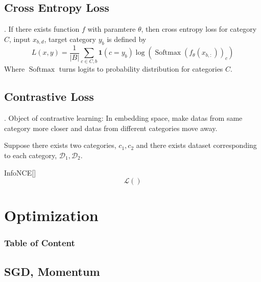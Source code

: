 \documentclass[8pt]{beamer}
\newcommand{\mb}[1]{\mathbf{#1}}
\newcommand{\mc}[1]{\mathcal{#1}}
\newcommand{\abs}[1]{\left\lvert #1 \right\rvert}
\newcommand{\Softmax}[1]{\operatorname{Softmax}\!\left(#1\right)}
\begin{document}
\subsection{Cross Entropy Loss}

\begin{frame}{.}
    If there exists function $f$ with paramtere $\theta$, then cross entropy loss for category $C$, input $x_{b,d}$, target category $y_{b}$ is defined by
    \[
        L(x,y) = \frac{1}{\abs{B}} \sum_{c \in C, b} \mb{1}(c = y_b) \log{( \Softmax{f_\theta(x_{b, :})}_{c})}
    \]
    Where $\operatorname{Softmax}$ turns logits to probability distribution for categories $C$.
\end{frame}

\subsection{Contrastive Loss}

\begin{frame}{.}
    Object of contrastive learning: In embedding space, make datas from same category more closer and datas from different categories move away.

    \bigskip
    Suppose there exists two categories, $c_1, c_2$ and there exists dataset corresponding to each category, $\mc{D}_1, \mc{D}_2$.

    \begin{block}{InfoNCE[\cite{oord2018representation}]}
        \[
            \mc{L}()
        \]
    \end{block}
\end{frame}



\section{Optimization}
\begingroup
    \begin{frame}
        \begin{multicols}{2}
            \frametitle{Table of Content}
            \tableofcontents
        \end{multicols}
    \end{frame}
\endgroup
\subsection{SGD, Momentum}
\end{document}
